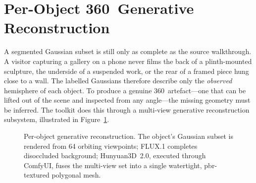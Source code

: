 \section{Per-Object 360\textdegree\ Generative Reconstruction}
\label{sec:sg-generative}

A segmented Gaussian subset is still only as complete as the source walkthrough. A visitor capturing a gallery on a phone never films the back of a plinth-mounted sculpture, the underside of a suspended work, or the rear of a framed piece hung close to a wall. The labelled Gaussians therefore describe only the \emph{observed} hemisphere of each object. To produce a genuine 360\textdegree\ artefact---one that can be lifted out of the scene and inspected from any angle---the missing geometry must be inferred. The toolkit does this through a multi-view generative reconstruction subsystem, illustrated in Figure~\ref{fig:sg-genpipe}.

\begin{figure}[htbp]
  \centering
  \caption{Per-object generative reconstruction. The object's Gaussian subset is rendered from 64 orbiting viewpoints; FLUX.1 completes disoccluded background; Hunyuan3D~2.0, executed through ComfyUI, fuses the multi-view set into a single watertight, \acrshort{pbr}-textured polygonal mesh.}
  \label{fig:sg-genpipe}
\end{figure}

